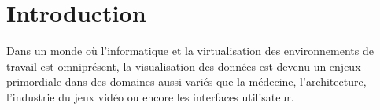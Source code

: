 \chapter{Introduction}
Dans un monde où l'informatique et la virtualisation des environnements de
travail est omniprésent, la visualisation des données est devenu un enjeux
primordiale dans des domaines aussi variés que la médecine, l'architecture,
l'industrie du jeux vidéo ou encore les interfaces utilisateur.




